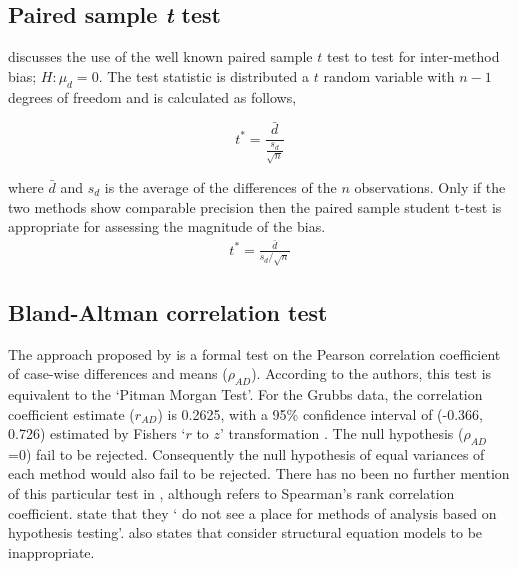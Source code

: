 \documentclass[Main.tex]{subfiles}
\begin{document}
\subsection{Paired sample \emph{t} test}

\citet{Bartko} discusses the use of the well known paired sample
$t$ test to test for inter-method bias; $H: \mu_{d}=0$. The test
statistic is distributed a $t$ random variable with $n-1$ degrees
of freedom and is calculated as follows,

\begin{equation}
t^{*} = \frac{\bar{d}}{ \frac{s_{d}}{\sqrt{n}}}
\end{equation}

where $\bar{d}$ and $s_{d}$ is the average of the differences of
the $n$ observations. Only if the two methods show comparable
precision then the paired sample student t-test is appropriate for
assessing the magnitude of the bias.
\begin{eqnarray}
t^{*} = \frac{\bar{d}}{s_{d}/\sqrt{n}}
\end{eqnarray}

	\subsection{Bland-Altman correlation test}
	
	The approach proposed by \citet{BA83} is a formal test on the
	Pearson correlation coefficient of case-wise differences and means ($\rho_{AD}$). According to the authors, this test is equivalent
	to the `Pitman Morgan Test'. For the Grubbs data, the correlation coefficient estimate ($r_{AD}$) is 0.2625, with a 95\% confidence
	interval of (-0.366, 0.726) estimated by Fishers `$r$ to $z$' transformation \citep*{Cohen}. The null hypothesis ($\rho_{AD}$ =0)
	fail to be rejected. Consequently the null hypothesis of equal variances of each method would also fail to be rejected. There has
	no been no further mention of this particular test in \citet{BA86}, although \citet{BA99} refers to Spearman's rank
	correlation coefficient. \citet{BA99} state that they ` do not see a place for methods of analysis based on hypothesis testing'.
	\citet{BA99} also states that consider structural equation models to be inappropriate.
	


\end{document}

